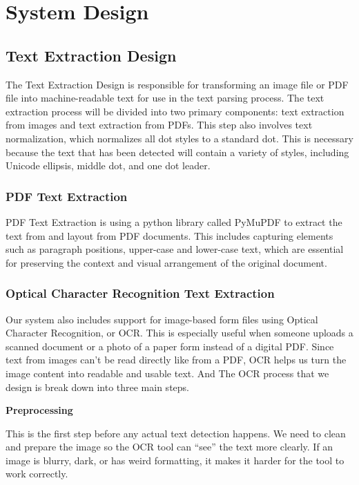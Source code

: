 \documentclass[12pt,oneside,openright,a4paper]{cpe-english-project}
\begin{document}
\section{System Design}

\subsection{Text Extraction Design}
The Text Extraction Design is responsible for transforming an image file or PDF file into machine-readable text for use in the text parsing process. The text extraction process will be divided into two primary components: text extraction from images and text extraction from PDFs. This step also involves text normalization, which normalizes all dot styles to a standard dot. This is necessary because the text that has been detected will contain a variety of styles, including Unicode ellipsis, middle dot, and one dot leader.

\subsubsection{PDF Text Extraction}
PDF Text Extraction is using a python library called PyMuPDF to extract the text from and layout from PDF documents. This includes capturing elements such as paragraph positions, upper-case and lower-case text, which are essential for preserving the context and visual arrangement of the original document.

\subsubsection{Optical Character Recognition Text Extraction}
Our system also includes support for image-based form files using Optical Character Recognition, or OCR. This is especially useful when someone uploads a scanned document or a photo of a paper form instead of a digital PDF. Since text from images can’t be read directly like from a PDF, OCR helps us turn the image content into readable and usable text. And The OCR process that we design is break down into three main steps.

\textbf{Preprocessing}

This is the first step before any actual text detection happens. We need to clean and prepare the image so the OCR tool can “see” the text more clearly. If an image is blurry, dark, or has weird formatting, it makes it harder for the tool to work correctly.
\end{document}
